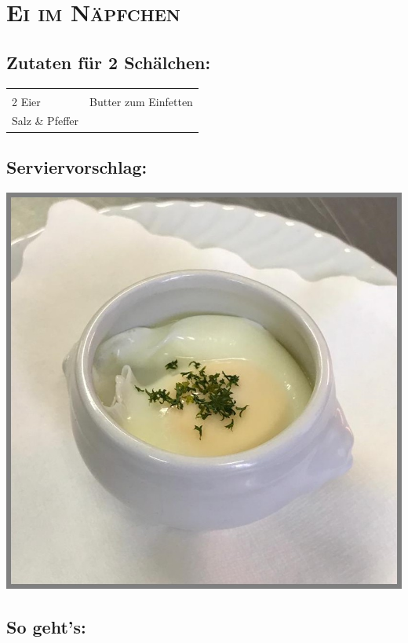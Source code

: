 \section{\textsc{Ei im Näpfchen}}

\subsection*{Zutaten für 2 Schälchen:}

\begin{tabular}{p{7.5cm} p{7.5cm}}
	& \\
	2 Eier & Butter zum Einfetten \\
	Salz \& Pfeffer &
\end{tabular}

\subsection*{Serviervorschlag:}

\includegraphics[width=\textwidth]{img/ei_naepfchen.jpg} \cite{eiimnaepfchen}

\subsection*{So geht's:}

